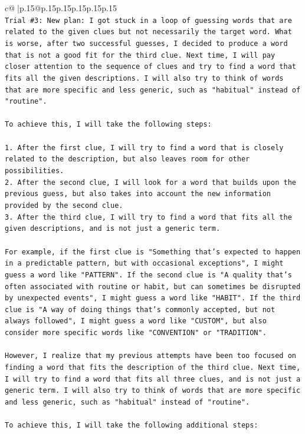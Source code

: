 \documentclass{article}
\begin{document}
{\begin{supertabular}{c@{$\;$}|p{.15\linewidth}@{}p{.15\linewidth}p{.15\linewidth}p{.15\linewidth}p{.15\linewidth}p{.15\linewidth}}
{{{\\ 
\texttt{Trial \#3: New plan: I got stuck in a loop of guessing words that are related to the given clues but not necessarily the target word. What is worse, after two successful guesses, I decided to produce a word that is not a good fit for the third clue. Next time, I will pay closer attention to the sequence of clues and try to find a word that fits all the given descriptions. I will also try to think of words that are more specific and less generic, such as "habitual" instead of "routine".} \\
\\ 
\texttt{To achieve this, I will take the following steps:} \\
\\ 
\texttt{1. After the first clue, I will try to find a word that is closely related to the description, but also leaves room for other possibilities.} \\
\texttt{2. After the second clue, I will look for a word that builds upon the previous guess, but also takes into account the new information provided by the second clue.} \\
\texttt{3. After the third clue, I will try to find a word that fits all the given descriptions, and is not just a generic term.} \\
\\ 
\texttt{For example, if the first clue is "Something that's expected to happen in a predictable pattern, but with occasional exceptions", I might guess a word like "PATTERN". If the second clue is "A quality that's often associated with routine or habit, but can sometimes be disrupted by unexpected events", I might guess a word like "HABIT". If the third clue is "A way of doing things that's commonly accepted, but not always followed", I might guess a word like "CUSTOM", but also consider more specific words like "CONVENTION" or "TRADITION".} \\
\\ 
\texttt{However, I realize that my previous attempts have been too focused on finding a word that fits the description of the third clue. Next time, I will try to find a word that fits all three clues, and is not just a generic term. I will also try to think of words that are more specific and less generic, such as "habitual" instead of "routine".} \\
\\ 
\texttt{To achieve this, I will take the following additional steps:} \\
\\ 
}}}
\end{supertabular}}
\end{document}

